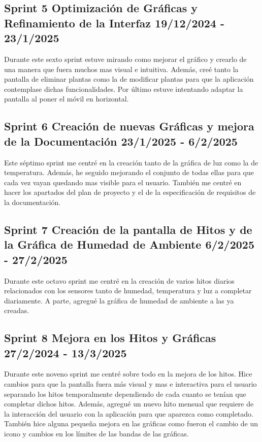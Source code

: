 \subsection{Sprint 5 Optimización de Gráficas y Refinamiento de la Interfaz  19/12/2024 - 23/1/2025}
Durante este sexto sprint estuve mirando como mejorar el gráfico y crearlo de una manera que fuera muchos mas visual e intuitiva. Además, creé tanto la pantalla de eliminar plantas como la de modificar plantas para que la aplicación contemplase dichas funcionalidades.
Por último estuve intentando adaptar la pantalla al poner el móvil en horizontal.

\subsection{Sprint 6 Creación de nuevas Gráficas y mejora de la Documentación  23/1/2025 - 6/2/2025}
Este séptimo sprint me centré en la creación tanto de la gráfica de luz como la de temperatura. Además, he seguido mejorando el conjunto de todas ellas para que cada vez vayan quedando mas visible para el usuario.
También me centré en hacer los apartados del plan de proyecto y el de la especificación de requisitos de la documentación.

\subsection{Sprint 7 Creación de la pantalla de Hitos y de la Gráfica de Humedad de Ambiente  6/2/2025 - 27/2/2025}
Durante este octavo sprint me centré en la creación de varios hitos diarios relacionados con los sensores tanto de humedad, temperatura y luz a completar diariamente.
A parte, agregué la gráfica de humedad de ambiente a las ya creadas.

\subsection{Sprint 8 Mejora en los Hitos y Gráficas 27/2/2024 - 13/3/2025}
Durante este noveno sprint me centré sobre todo en la mejora de los hitos. Hice cambios para que la pantalla fuera más visual y mas e interactiva para el usuario separando los hitos temporalmente dependiendo de cada cuanto se tenían que completar dichos hitos. Además, agregué un nuevo hito mensual que requiere de la interacción del usuario con la aplicación para que aparezca como completado.
También hice alguna pequeña mejora en las gráficas como fueron el cambio de un icono y cambios en los límites de las bandas de las gráficas.

